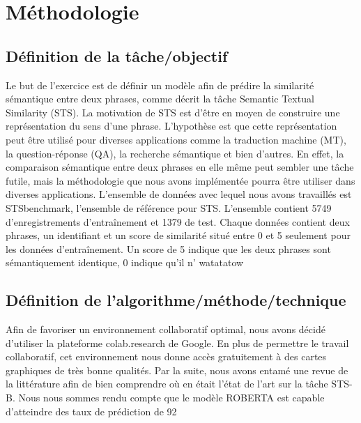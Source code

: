 \documentclass[11pt,a4paper, french]{article}
\begin{document}
%

\section{Méthodologie}


\subsection{Définition de la tâche/objectif}
Le but de l’exercice est de définir un modèle afin de prédire la similarité sémantique entre deux phrases, comme décrit la tâche Semantic Textual Similarity (STS). La motivation de STS est d’être en moyen de construire une représentation du sens d’une phrase. L’hypothèse est que cette représentation peut être utilisé pour diverses applications comme la traduction machine (MT), la question-réponse (QA), la recherche sémantique et bien d’autres. En effet, la comparaison sémantique entre deux phrases en elle même peut sembler une tâche futile, mais la méthodologie que nous avons implémentée pourra être utiliser dans diverses applications. L’ensemble de données avec lequel nous avons travaillés est STSbenchmark, l’ensemble de référence pour STS. L’ensemble contient 5749 d’enregistrements d'entraînement et 1379 de test. Chaque données contient deux phrases, un identifiant et un score de similarité situé entre 0 et 5 seulement pour les données d'entraînement. Un score de 5 indique que les deux phrases sont sémantiquement identique, 0 indique qu’il n’ watatatow


\subsection{Définition de l'algorithme/méthode/technique}

Afin de favoriser un environnement collaboratif optimal, nous avons décidé d’utiliser la plateforme colab.research de Google. En plus de permettre le travail collaboratif, cet environnement nous donne accès gratuitement à des cartes graphiques de très bonne qualités. Par la suite, nous avons entamé une revue de la littérature afin de bien comprendre où en était l’état de l’art sur la tâche STS-B. Nous nous sommes rendu compte que le modèle ROBERTA est capable d’atteindre des taux de prédiction de 92 %
\end{document}
